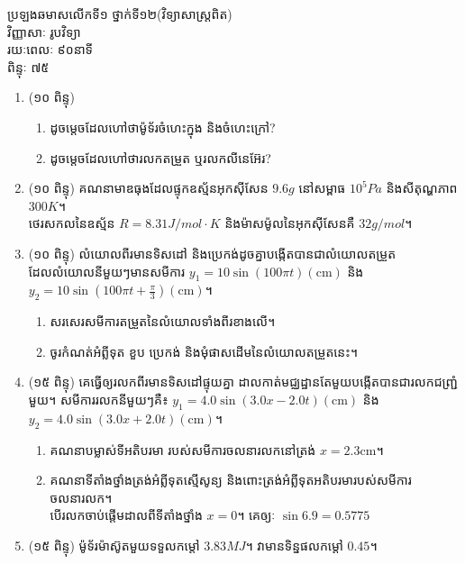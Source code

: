 \documentclass{classes/exam}
\begin{document}
	\begin{center}
		{\kml ប្រឡងឆមាសលើកទី១ ថ្នាក់ទី១២(វិទ្យាសាស្រ្តពិត)\\
		វិញ្ញាសាៈ រូបវិទ្យា\\
		រយៈពេលៈ ៩០នាទី\\
		ពិន្ទុៈ ៧៥}
	\end{center}
	\begin{enumerate}[I]
		\item {\color{magenta}\ks (១០ ពិន្ទុ)}
		\begin{enumerate}[k,2]
			\item ដូចម្តេចដែលហៅថាម៉ូទ័រចំហេះក្នុង និងចំហេះក្រៅ?
			\item ដូចម្តេចដែលហៅថារលកតម្រួត ឬរលកលីនេអ៊ែរ?
		\end{enumerate}
		\item {\color{magenta}\ks (១០ ពិន្ទុ)} គណនាមាឌធុងដែលផ្ទុកឧស្ម័នអុកសុីសែន $9.6g$ នៅសម្ពាធ $10^{5}Pa$ និងសីតុណ្ហភាព $300K$។ \\ថេរសកលនៃឧស្ម័ន $R=8.31J/mol\cdot K$ និងម៉ាសម៉ូលនៃអុកសុីសែនគឺ $32g/mol$។
		\item {\color{magenta}\ks (១០ ពិន្ទុ)} លំយោលពីរមានទិសដៅ និងប្រេកង់ដូចគ្នាបង្កើតបានជាលំយោលតម្រួតដែលលំយោលនីមួយៗមានសមីការ $y_{1}=10\sin\left(100\pi t\right)\left(\si{\centi\metre}\right)$ និង $y_{2}=10\sin\left(100\pi t+\frac{\pi}{3}\right)\left(\si{\centi\metre}\right)$។
		\begin{enumerate}[k]
			\item សរសេរសមីការតម្រួតនៃលំយោលទាំងពីរខាងលើ។
			\item ចូរកំណត់អំព្លីទុត ខួប ប្រេកង់ និងមុំផាសដើមនៃលំយោលតម្រួតនេះ។
		\end{enumerate}
		\item {\color{magenta}\ks (១៥ ពិន្ទុ)} គេធ្វើឲ្យរលកពីរមានទិសដៅផ្ទុយគ្នា ដាលកាត់មជ្ឈដ្ឋានតែមួយបង្កើតបានជារលកជញ្រ្ជំមួយ។ សមីការរលកនីមួយៗគឺ៖
		$y_{1}=4.0\sin\left(3.0x-2.0t\right)\left(\si{\centi\metre}\right)$ និង $y_{2}=4.0\sin\left(3.0x+2.0t\right)\left(\si{\centi\metre}\right)$។
		\begin{enumerate}[k]
			\item គណនាបម្លាស់ទីអតិបរមា របស់សមីការចលនារលកនៅត្រង់ $x=2.3\si{\centi\metre}$។
			\item គណនាទីតាំងថ្នាំងត្រង់អំព្លីទុតស្មើសូន្យ និងពោះត្រង់អំព្លីទុតអតិបរមារបស់សមីការចលនារលក។\\ បើរលកចាប់ផ្តើមដាលពីទីតាំងថ្នាំង $x=0$។ គេឲ្យៈ $\sin6.9=0.5775$
		\end{enumerate}
		\item {\color{magenta}\ks (១៥ ពិន្ទុ)} ម៉ូទ័រម៉ាស៊ូតមួយទទួលកម្តៅ $3.83MJ$។ វាមានទិន្នផលកម្តៅ $0.45$។

\end{enumerate}
\end{document}
